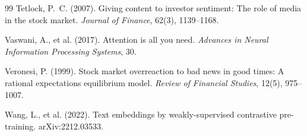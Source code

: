 \documentclass[11pt,a4paper]{article}
\theoremstyle{plain}
\theoremstyle{definition}
\begin{document}
\begin{thebibliography}{99}
Tetlock, P.~C. (2007). Giving content to investor sentiment: The role of media in the stock market. \emph{Journal of Finance}, 62(3), 1139--1168.

Vaswani, A., et al. (2017). Attention is all you need. \emph{Advances in Neural Information Processing Systems}, 30.

Veronesi, P. (1999). Stock market overreaction to bad news in good times: A rational expectations equilibrium model. \emph{Review of Financial Studies}, 12(5), 975--1007.

Wang, L., et al. (2022). Text embeddings by weakly-supervised contrastive pre-training. arXiv:2212.03533.

\end{thebibliography}
\end{document}
